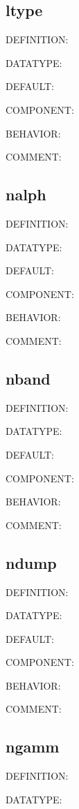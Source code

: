 \subsection{ltype}
{\color{red}DEFINITION:}

{\color{green}DATATYPE:}

{\color{blue}DEFAULT:}

{\color{brown}COMPONENT:}

{\color{purple}BEHAVIOR:}

{\color{olive}COMMENT:}

\subsection{nalph}
{\color{red}DEFINITION:}

{\color{green}DATATYPE:}

{\color{blue}DEFAULT:}

{\color{brown}COMPONENT:}

{\color{purple}BEHAVIOR:}

{\color{olive}COMMENT:}

\subsection{nband}
{\color{red}DEFINITION:}

{\color{green}DATATYPE:}

{\color{blue}DEFAULT:}

{\color{brown}COMPONENT:}

{\color{purple}BEHAVIOR:}

{\color{olive}COMMENT:}

\subsection{ndump}
{\color{red}DEFINITION:}

{\color{green}DATATYPE:}

{\color{blue}DEFAULT:}

{\color{brown}COMPONENT:}

{\color{purple}BEHAVIOR:}

{\color{olive}COMMENT:}

\subsection{ngamm}
{\color{red}DEFINITION:}

{\color{green}DATATYPE:}

